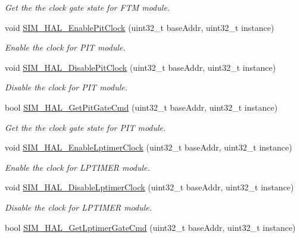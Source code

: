 \begin{DoxyCompactItemize}
\begin{DoxyCompactList}\small\item\em Get the the clock gate state for F\+TM module. \end{DoxyCompactList}\item 
void \hyperlink{group__sim__hal_ga47316648148eb5c74be15f71069bb784}{S\+I\+M\+\_\+\+H\+A\+L\+\_\+\+Enable\+Pit\+Clock} (uint32\+\_\+t base\+Addr, uint32\+\_\+t instance)
\begin{DoxyCompactList}\small\item\em Enable the clock for P\+IT module. \end{DoxyCompactList}\item 
void \hyperlink{group__sim__hal_ga9f65f3c498fe0820c5cd7ef4ba5ba042}{S\+I\+M\+\_\+\+H\+A\+L\+\_\+\+Disable\+Pit\+Clock} (uint32\+\_\+t base\+Addr, uint32\+\_\+t instance)
\begin{DoxyCompactList}\small\item\em Disable the clock for P\+IT module. \end{DoxyCompactList}\item 
bool \hyperlink{group__sim__hal_ga50b9ff5cfee0dfb5c205ce944a6ab880}{S\+I\+M\+\_\+\+H\+A\+L\+\_\+\+Get\+Pit\+Gate\+Cmd} (uint32\+\_\+t base\+Addr, uint32\+\_\+t instance)
\begin{DoxyCompactList}\small\item\em Get the the clock gate state for P\+IT module. \end{DoxyCompactList}\item 
void \hyperlink{group__sim__hal_ga3eeb7828922d46d50bcbf341ba020bc7}{S\+I\+M\+\_\+\+H\+A\+L\+\_\+\+Enable\+Lptimer\+Clock} (uint32\+\_\+t base\+Addr, uint32\+\_\+t instance)
\begin{DoxyCompactList}\small\item\em Enable the clock for L\+P\+T\+I\+M\+ER module. \end{DoxyCompactList}\item 
void \hyperlink{group__sim__hal_ga769f19968c4ea40f87d29971f1de6744}{S\+I\+M\+\_\+\+H\+A\+L\+\_\+\+Disable\+Lptimer\+Clock} (uint32\+\_\+t base\+Addr, uint32\+\_\+t instance)
\begin{DoxyCompactList}\small\item\em Disable the clock for L\+P\+T\+I\+M\+ER module. \end{DoxyCompactList}\item 
bool \hyperlink{group__sim__hal_ga1b924a1cc94560801fbd0e9091a02b5d}{S\+I\+M\+\_\+\+H\+A\+L\+\_\+\+Get\+Lptimer\+Gate\+Cmd} (uint32\+\_\+t base\+Addr, uint32\+\_\+t instance)

\end{DoxyCompactItemize}
